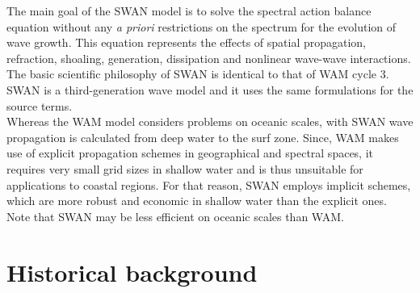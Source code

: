 \documentclass[12pt]{book}
\begin{document}
\tableofcontents

 \label{ch:intro}

The main goal of the SWAN model is to solve the spectral action balance equation without any {\em a priori}
restrictions on the spectrum for the evolution of wave growth. This equation represents the effects of
spatial propagation, refraction, shoaling, generation, dissipation and nonlinear wave-wave interactions.
The basic scientific philosophy of SWAN is identical to that of WAM cycle 3. SWAN is a third-generation wave
model and it uses the same formulations for the source terms.
\nocite{WAM88}
\\[2ex]
\noindent
Whereas the WAM model considers problems on oceanic scales, with SWAN wave propagation is calculated
from deep water to the surf zone. Since, WAM makes use of explicit propagation schemes in geographical and
spectral spaces, it requires very small grid sizes in shallow water and is thus unsuitable for applications
to coastal regions. For that reason, SWAN employs implicit schemes, which are more robust and economic
in shallow water than the explicit ones. Note that SWAN may be less efficient on oceanic scales than WAM.

\section{Historical background} \label{sec:hist}
\end{document}
